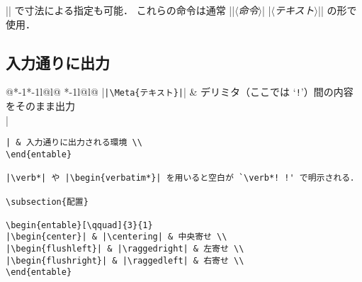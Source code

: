 \documentclass[9pt,a4paper,landscape,dvipdfmx]{jsarticle}
\makeatletter
\def\set@etsep#1#2{\def\etcolsep{#1}\def\etitemsep{#2}}
\newenvironment{entable}[3][\quad\qquad]{%
  \set@etsep#1\relax\relax
  \begin{tabular}{%
    @{}*{\the\numexpr#3-1}{*{\the\numexpr#2-1}{l@{\etcolsep}}l@{\etitemsep}}%
    *{\the\numexpr#2-1}{l@{\etcolsep}}l@{}}}{%
  \end{tabular}}
\newcommand{\Meta}[1]{$\langle$\mbox{}\emph{#1}\mbox{}$\rangle$}
\makeatother
\begin{document}
\egroup

\vspace{-10pt}

|\fontsize{|\Meta{サイズ}|}{|\Meta{行送り}|}\selectfont| で寸法による指定も可能．
これらの命令は通常 |{|\Meta{命令}| |\Meta{テキスト}|}| の形で使用．

\subsection{入力通りに出力}

\begin{entable}[\enspace]{2}{1}
|\verb!|\Meta{テキスト}|!| & デリミタ（ここでは `\texttt{!}'）間の内容をそのまま出力 \\
|\begin{verbatim}| & 入力通りに出力される環境 \\
\end{entable}

|\verb*| や |\begin{verbatim*}| を用いると空白が `\verb*! !' で明示される．

\subsection{配置}

\begin{entable}[\qquad]{3}{1}
|\begin{center}| & |\centering| & 中央寄せ \\
|\begin{flushleft}| & |\raggedright| & 左寄せ \\
|\begin{flushright}| & |\raggedleft| & 右寄せ \\
\end{entable}


\end{verbatim}
\end{entable}
\end{document}
\end{multicols}
\end{document}
